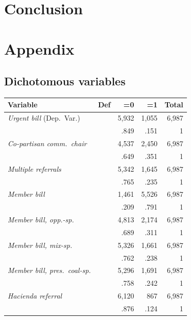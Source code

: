 \documentclass[letter,12pt]{article}
\begin{document}
\section{Conclusion}

\section{Appendix}

\subsection{Dichotomous variables}

\begin{tabular}{llrrr}
 Variable                          & Def &       =0 &       =1 & Total  \\ \hline
\emph{Urgent bill} (Dep.~Var.)     &     &    5,932 &    1,055 &6,987 \\
                                   &     &   .849   &   .151   &   1  \\
\emph{Co-partisan comm.~chair}     &     &    4,537 &    2,450 &6,987 \\
                                   &     &   .649   &   .351   &   1  \\
\emph{Multiple referrals}          &     &    5,342 &    1,645 &6,987 \\
                                   &     &   .765   &   .235   &   1  \\
\emph{Member bill}                 &     &    1,461 &    5,526 &6,987 \\
                                   &     &   .209   &   .791   &   1  \\
\emph{Member bill, opp.-sp.}       &     &    4,813 &    2,174 &6,987 \\
                                   &     &   .689   &   .311   &   1  \\
\emph{Member bill, mix-sp.}        &     &    5,326 &    1,661 &6,987 \\
                                   &     &   .762   &   .238   &   1  \\
\emph{Member bill, pres.~coal-sp.} &     &    5,296 &    1,691 &6,987 \\
                                   &     &   .758   &   .242   &   1  \\
\emph{Hacienda referral}           &     &    6,120 &      867 &6,987 \\
                                   &     &   .876   &   .124   &   1  \\

\end{tabular}
\end{document}
